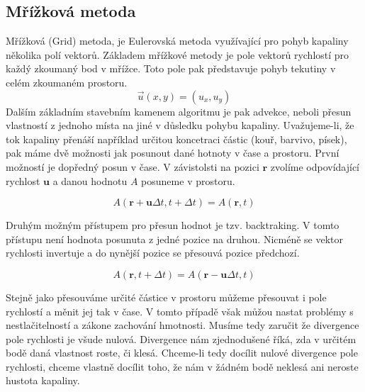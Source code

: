 \subsection{Mřížková metoda}
Mřížková (Grid) metoda, je Eulerovská metoda využívající pro pohyb kapaliny několika polí vektorů. Základem mřížkové metody je pole vektorů rychlostí pro každý zkoumaný bod v mřížce. Toto pole pak představuje pohyb tekutiny v celém zkoumaném prostoru. 
\begin{equation}
    \Vec{u}(x,y) = (u_x,u_y)
\end{equation}
Dalším základním stavebním kamenem algoritmu je pak advekce, neboli přesun vlastností z jednoho místa na jiné v důsledku pohybu kapaliny. Uvažujeme-li, že tok kapaliny přenáší například určitou koncetraci částic (kouř, barvivo, písek), pak máme dvě možnosti jak posunout dané hotnoty v čase a prostoru.  První možností je dopředný posun v čase. V závistolsti na pozici $\mathbf{r}$ zvolíme odpovídající rychlost $\mathbf{u}$ a danou hodnotu $A$ posuneme v prostoru. 

\begin{equation}
     A(\mathbf{r} + \mathbf{u}\Delta t, t + \Delta t) = A(\mathbf{r}, t)
\end{equation}

Druhým možným přístupem pro přesun hodnot je tzv. backtraking. V tomto přístupu není hodnota posunuta z jedné pozice na druhou. Nicméně se vektor rychlosti invertuje a do nynější pozice se přesouvá pozice předchozí.

\begin{equation}
    A(\mathbf{r}, t + \Delta t) = A(\mathbf{r} - \mathbf{u}\Delta t, t)
\end{equation}

Stejně jako přesouváme určité částice v prostoru můžeme přesouvat i pole rychlostí a měnit jej tak v čase. V tomto případě však můžou nastat problémy s nestlačitelností a zákone zachování hmotnosti. Musíme tedy zaručit že divergence pole rychlosti je všude nulová. Divergence nám zjednodušené říká, zda v určitém bodě daná vlastnost roste, či klesá. Chceme-li tedy docílit nulové divergence pole rychlosti, chceme vlastně docílit toho, že nám v žádném bodě neklesá ani neroste hustota kapaliny. \cite{webglFluid}


